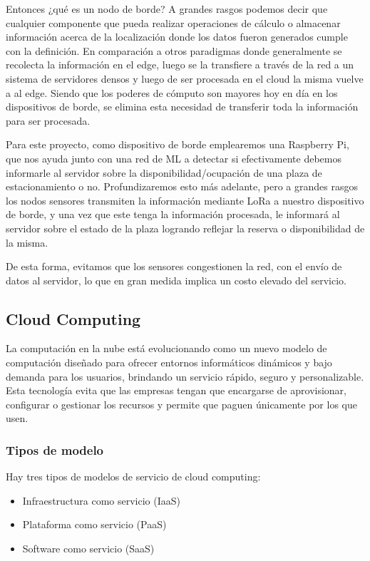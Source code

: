 Entonces ¿qué es un nodo de borde? A grandes rasgos podemos decir que cualquier componente que pueda realizar operaciones de cálculo o almacenar información acerca de la localización donde los datos fueron generados cumple con la definición. En comparación a otros paradigmas donde generalmente se recolecta la información en el edge, luego se la transfiere a través de la red a un sistema de servidores densos y luego de ser procesada en el cloud la misma vuelve a al edge. Siendo que los poderes de cómputo son mayores hoy en día en los dispositivos de borde, se elimina esta necesidad de transferir toda la información para ser procesada.

Para este proyecto, como dispositivo de borde emplearemos una Raspberry Pi, que nos ayuda junto con una red de ML a detectar si efectivamente debemos informarle al servidor sobre la disponibilidad/ocupación de una plaza de estacionamiento o no. Profundizaremos esto más adelante, pero a grandes rasgos los nodos sensores transmiten la información mediante LoRa a nuestro dispositivo de borde, y una vez que este tenga la información procesada, le informará al servidor sobre el estado de la plaza logrando reflejar la reserva o disponibilidad de la misma.

De esta forma, evitamos que los sensores congestionen la red, con el envío de datos al servidor, lo que en gran medida implica un costo elevado del servicio.

\subsection{Cloud Computing}
La computación en la nube está evolucionando como un nuevo modelo de computación diseñado para ofrecer entornos informáticos dinámicos y bajo demanda para los usuarios, brindando un servicio rápido, seguro y personalizable. Esta tecnología evita que las empresas tengan que encargarse de aprovisionar, configurar o gestionar los recursos y permite que paguen únicamente por los que usen.

\subsubsection{Tipos de modelo}
Hay tres tipos de modelos de servicio de cloud computing:

\begin{itemize}
    \item Infraestructura como servicio (IaaS)
    \item Plataforma como servicio (PaaS)
    \item Software como servicio (SaaS)
\end{itemize}

